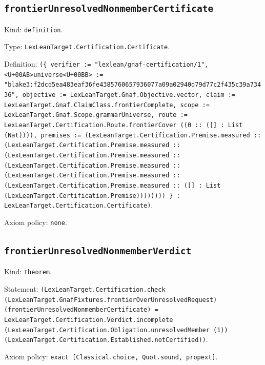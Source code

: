 \documentclass[11pt]{article}
\begin{document}
\subsection*{\texttt{frontierUnresolvedNonmemberCertificate}}
\noindent Kind: \texttt{definition}.\par
\noindent Type: \texttt{LexLeanTarget.Certification.Certificate}.\par
\noindent Definition: \texttt{(\{ verifier := "lexlean/gnaf-certification/1", <U+00AB>universe<U+00BB> := "blake3:f2dcd5ea483eaf36fe4385760657936077a09a02940d79d77c2f435c39a73436", objective := LexLeanTarget.Gnaf.Objective.vector, claim := LexLeanTarget.Gnaf.ClaimClass.frontierComplete, scope := LexLeanTarget.Gnaf.Scope.grammarUniverse, route := LexLeanTarget.Certification.Route.frontierCover ((0 :: ([] : List (Nat)))), premises := (LexLeanTarget.Certification.Premise.measured :: (LexLeanTarget.Certification.Premise.measured :: (LexLeanTarget.Certification.Premise.measured :: (LexLeanTarget.Certification.Premise.measured :: (LexLeanTarget.Certification.Premise.measured :: (LexLeanTarget.Certification.Premise.measured :: ([] : List (LexLeanTarget.Certification.Premise)))))))) \} : LexLeanTarget.Certification.Certificate)}.\par
\noindent Axiom policy: \texttt{none}.\par
\subsection*{\texttt{frontierUnresolvedNonmemberVerdict}}
\noindent Kind: \texttt{theorem}.\par
\noindent Statement: \texttt{(LexLeanTarget.Certification.check (LexLeanTarget.GnafFixtures.frontierOverUnresolvedRequest) (frontierUnresolvedNonmemberCertificate) = LexLeanTarget.Certification.Verdict.incomplete (LexLeanTarget.Certification.Obligation.unresolvedMember (1)) (LexLeanTarget.Certification.Established.notCertified))}.\par
\noindent Axiom policy: \texttt{exact [Classical.choice, Quot.sound, propext]}.\par
\end{document}
